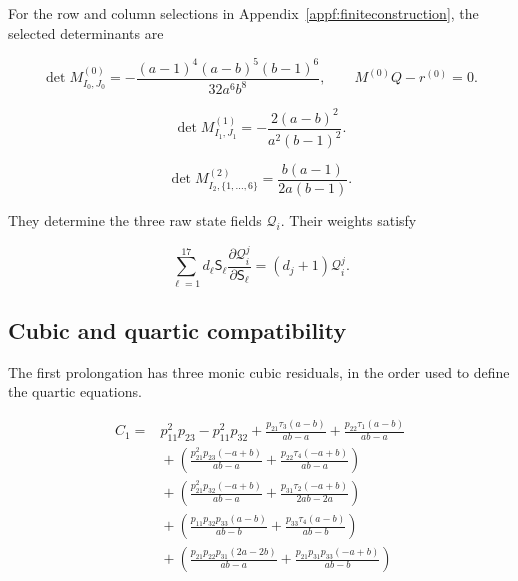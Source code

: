 For the row and column selections in Appendix~\ref{appf:finiteconstruction},
the selected determinants are

\begin{equation}\label{supp:fnd:firstminor}
\det M^{(0)}_{I_0,J_0}=-\frac{(a-1)^4(a-b)^5(b-1)^6}{32a^6b^8},
\qquad M^{(0)}Q-r^{(0)}=0.
\end{equation}

\begin{equation}\label{supp:fnd:secondminor}
\det M^{(1)}_{I_1,J_1}=-\frac{2(a-b)^2}{a^2(b-1)^2}.
\end{equation}

\begin{equation}\label{supp:appf:minor2}
\det M^{(2)}_{I_2,\{1,\ldots,6\}}=\frac{b(a-1)}{2a(b-1)}.
\end{equation}

They determine the three raw state fields $\mathcal Q_i$. Their
weights satisfy

\begin{equation}\label{supp:appf:weightidentity}
 \sum_{\ell=1}^{17}d_\ell \mathsf S_\ell
       \frac{\partial\mathcal Q_i^j}{\partial \mathsf S_\ell}
 =(d_j+1)\mathcal Q_i^j.
\end{equation}

\subsection{Cubic and quartic compatibility}

The first prolongation has three monic cubic residuals, in the
order used to define the quartic equations.

\begin{equation}\label{supp:fnd:cubic1}
\begin{aligned}
C_1={}&p_{11}^{2} p_{23} - p_{11}^{2} p_{32} + \frac{p_{21} \tau_{3} \left(a - b\right)}{a b - a} + \frac{p_{22} \tau_{1} \left(a - b\right)}{a b - a}\\
&{}+(\frac{p_{21}^{2} p_{23} \left(- a + b\right)}{a b - a} + \frac{p_{22} \tau_{4} \left(- a + b\right)}{a b - a})\\
&{}+(\frac{p_{21}^{2} p_{32} \left(- a + b\right)}{a b - a} + \frac{p_{31} \tau_{2} \left(- a + b\right)}{2 a b - 2 a})\\
&{}+(\frac{p_{11} p_{32} p_{33} \left(a - b\right)}{a b - b} + \frac{p_{33} \tau_{4} \left(a - b\right)}{a b - b})\\
&{}+(\frac{p_{21} p_{22} p_{31} \left(2 a - 2 b\right)}{a b - a} + \frac{p_{21} p_{31} p_{33} \left(- a + b\right)}{a b - b})
\end{aligned}
\end{equation}

